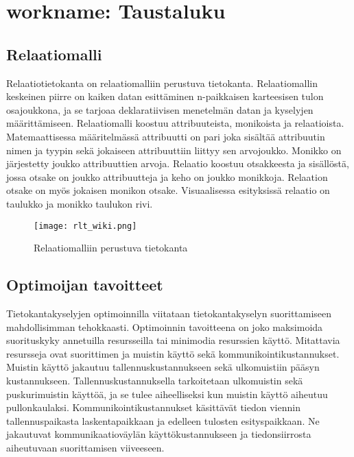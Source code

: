 \documentclass[finnish]{tktltiki2}
\theoremstyle{definition}
\theoremstyle{remark}
\begin{document}


\section{workname: Taustaluku}
\subsection{Relaatiomalli}

Relaatiotietokanta on relaatiomalliin \cite{codd1970relational} perustuva tietokanta. Relaatiomallin keskeinen piirre on kaiken datan esittäminen n-paikkaisen karteesisen tulon osajoukkona, ja se tarjoaa deklaratiivisen menetelmän datan ja kyselyjen määrittämiseen. Relaatiomalli koostuu attribuuteista, monikoista ja relaatioista. Matemaattisessa määritelmässä attribuutti on pari joka sisältää attribuutin nimen ja tyypin sekä jokaiseen attribuuttiin liittyy sen arvojoukko. Monikko on järjestetty joukko attribuuttien arvoja. Relaatio koostuu otsakkeesta ja sisällöstä, jossa otsake on joukko attribuutteja ja keho on joukko monikkoja. Relaation otsake on myös jokaisen monikon otsake. Visuaalisessa esityksissä relaatio on taulukko ja monikko taulukon rivi. 

\begin{figure}[!h]
  \caption{Relaatiomalliin perustuva tietokanta}
  \centering
    \texttt{[image: rlt\_wiki.png]}
\end{figure}

\subsection{Optimoijan tavoitteet}
Tietokantakyselyjen optimoinnilla viitataan tietokantakyselyn suorittamiseen mahdollisimman tehokkaasti. Optimoinnin tavoitteena on joko maksimoida suorituskyky annetuilla resursseilla tai minimodia resurssien käyttö. Mitattavia resursseja ovat suorittimen ja muistin käyttö sekä kommunikointikustannukset. \cite{jarke1984} Muistin käyttö jakautuu tallennuskustannukseen sekä ulkomuistiin pääsyn kustannukseen. Tallennuskustannuksella tarkoitetaan ulkomuistin sekä puskurimuistin käyttöä, ja se tulee aiheelliseksi kun muistin käyttö aiheutuu pullonkaulaksi. Kommunikointikustannukset käsittävät tiedon viennin tallennuspaikasta laskentapaikkaan ja edelleen tulosten esityspaikkaan. Ne jakautuvat kommunikaatioväylän käyttökustannukseen ja tiedonsiirrosta aiheutuvaan suorittamisen viiveeseen.
\end{document}
